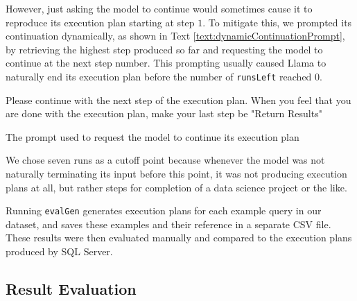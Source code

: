 However, just asking the model to continue would sometimes cause it to reproduce its execution plan starting at step $1$. To mitigate this, we prompted its continuation dynamically, as shown in Text \ref{text:dynamicContinuationPrompt}, by retrieving the highest step produced so far and requesting the model to continue at the next step number. This prompting usually caused Llama to naturally end its execution plan before the number of \lstinline{runsLeft} reached $0$.

\begin{text}
  Please continue with the next step of the execution plan. When you feel that you are done with the execution plan, make your last step be "Return Results"
  \caption{The prompt used to request the model to continue its execution plan}
  \label{text:dynamicContinuationPrompt}
\end{text}

We chose seven runs as a cutoff point because whenever the model was not naturally terminating its input before this point, it was not producing execution plans at all, but rather steps for completion of a data science project or the like.

Running \lstinline{evalGen} generates execution plans for each example query in our dataset, and saves these examples and their reference in a separate CSV file. These results were then evaluated manually and compared to the execution plans produced by SQL Server.

\subsection{Result Evaluation}
